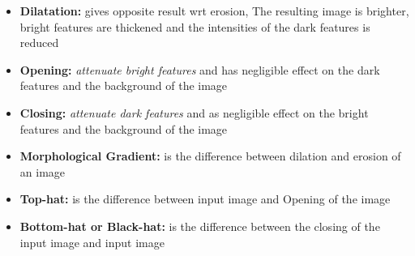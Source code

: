 \documentclass{article}
\begin{document}
\begin{itemize}
    \item \textbf{Dilatation:} gives opposite result wrt erosion, The resulting image is brighter, bright features are thickened and the intensities of the dark features is reduced
    \item \textbf{Opening:} \textit{attenuate bright features} and has negligible effect on the dark features and the background of the image
    \item \textbf{Closing:} \textit{attenuate dark features} and as negligible effect on the bright features and the background of the image
    \item \textbf{Morphological Gradient:} is the difference between dilation and erosion of an image
    \item \textbf{Top-hat:} is the difference between input image and Opening of the image
    \item \textbf{Bottom-hat or Black-hat:} is the difference between the closing of the input image and input image
\end{itemize}

\newpage
\end{document}
